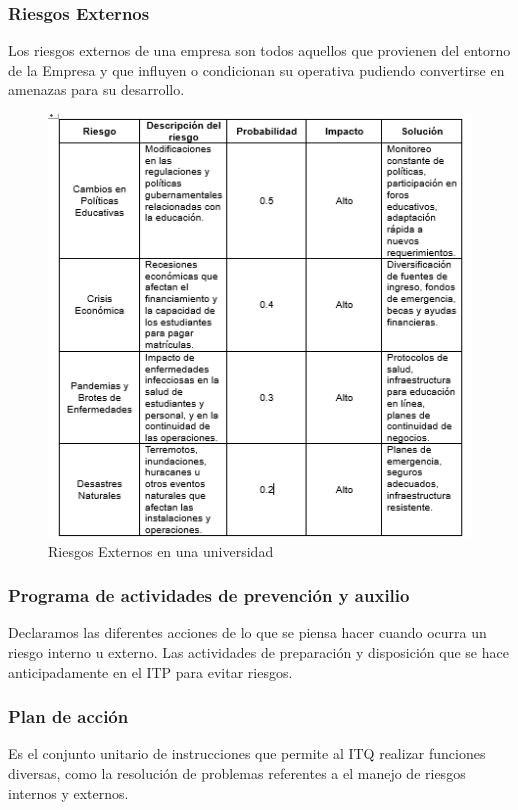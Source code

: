 \subsubsection{Riesgos Externos}

Los riesgos externos de una empresa son todos aquellos que provienen del entorno de la Empresa y que influyen o condicionan su operativa pudiendo convertirse en amenazas para su desarrollo. \cite{Riesgos}
%
%
\begin{figure}[H]
    \centering
    \includegraphics[scale=0.4]{10/Img/riesgosExternos.png}
    \caption{Riesgos Externos en una universidad}
    \label{fig:riesgosExternos.png}
\end{figure}
%
%
\subsubsection{Programa de actividades de prevención y auxilio}

Declaramos las diferentes acciones de lo que se piensa hacer cuando ocurra un riesgo interno u externo. 
Las actividades de preparación y disposición que se hace anticipadamente en el ITP para evitar riesgos.
% 
% 
\subsubsection{Plan de acción}

Es el conjunto unitario de instrucciones que permite al ITQ realizar funciones diversas, como la resolución de problemas referentes a el manejo de riesgos internos y externos.
%
%
